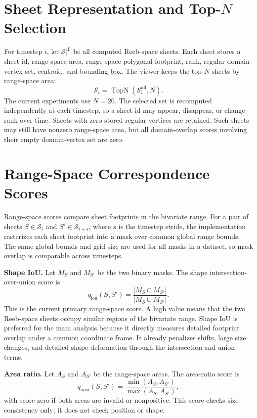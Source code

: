 \documentclass{vgtc}
\newcommand{\Sheets}{\mathcal{S}}
\newcommand{\Sheet}{S}
\newcommand{\myparagraph}[1]{\vspace{1mm} \noindent \textbf{#1}}
\begin{document}
\section{Sheet Representation and Top-$N$ Selection}

For timestep $i$, let $\Sheets_i^\mathrm{all}$ be all computed Reeb-space sheets. Each sheet stores a sheet id, range-space area, range-space polygonal footprint, rank, regular domain-vertex set, centroid, and bounding box. The viewer keeps the top $N$ sheets by range-space area:
$$
\Sheets_i=\operatorname{TopN}(\Sheets_i^\mathrm{all},N).
$$
The current experiments use $N=20$. The selected set is recomputed independently at each timestep, so a sheet id may appear, disappear, or change rank over time. Sheets with zero stored regular vertices are retained. Such sheets may still have nonzero range-space area, but all domain-overlap scores involving their empty domain-vertex set are zero.

\section{Range-Space Correspondence Scores}

Range-space scores compare sheet footprints in the bivariate range. For a pair of sheets $\Sheet\in\Sheets_i$ and $\Sheet'\in\Sheets_{i+s}$, where $s$ is the timestep stride, the implementation rasterizes each sheet footprint into a mask over common global range bounds. The same global bounds and grid size are used for all masks in a dataset, so mask overlap is comparable across timesteps.

\myparagraph{Shape IoU.}
Let $M_\Sheet$ and $M_{\Sheet'}$ be the two binary masks. The shape intersection-over-union score is
$$
q_\mathrm{iou}(\Sheet,\Sheet')=
\frac{|M_\Sheet\cap M_{\Sheet'}|}{|M_\Sheet\cup M_{\Sheet'}|}.
$$
This is the current primary range-space score. A high value means that the two Reeb-space sheets occupy similar regions of the bivariate range. Shape IoU is preferred for the main analysis because it directly measures detailed footprint overlap under a common coordinate frame. It already penalizes shifts, large size changes, and detailed shape deformation through the intersection and union terms.

\myparagraph{Area ratio.}
Let $A_\Sheet$ and $A_{\Sheet'}$ be the range-space areas. The area-ratio score is
$$
q_\mathrm{area}(\Sheet,\Sheet')=
\frac{\min(A_\Sheet,A_{\Sheet'})}{\max(A_\Sheet,A_{\Sheet'})},
$$
with score zero if both areas are invalid or nonpositive. This score checks size consistency only; it does not check position or shape.
\end{document}
